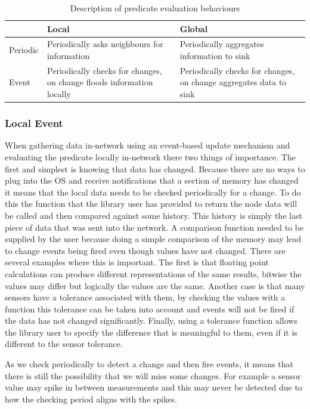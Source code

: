 \begin{table}[H]
\centering
\begin{tabular}{| l | m{5cm} | m{5cm} |}
\hline
~ & Local & Global \\
\hline
Periodic & Periodically asks neighbours for information & Periodically aggregates information to sink \\
\hline
Event & Periodically checks for changes, on change floods information locally &  Periodically checks for changes, on change aggregates data to sink \\
\hline
\end{tabular}
\caption{Description of predicate evaluation behaviours}
\end{table}


\subsubsection{Local Event}

When gathering data in-network using an event-based update mechanism and evaluating the predicate locally in-network there two things of importance. The first and simplest is knowing that data has changed. Because there are no ways to plug into the OS and receive notifications that a section of memory has changed it means that the local data needs to be checked periodically for a change. To do this the function that the library user has provided to return the node data will be called and then compared against some history. This history is simply the last piece of data that was sent into the network. A comparison function needed to be supplied by the user because doing a simple comparison of the memory may lead to change events being fired even though values have not changed. There are several examples where this is important. The first is that floating point calculations can produce different representations of the same results, bitwise the values may differ but logically the values are the same. Another case is that many sensors have a tolerance associated with them, by checking the values with a function this tolerance can be taken into account and events will not be fired if the data has not changed significantly. Finally, using a tolerance function allows the library user to specify the difference that is meaningful to them, even if it is different to the sensor tolerance.

As we check periodically to detect a change and then fire events, it means that there is still the possibility that we will miss some changes. For example a sensor value may spike in between measurements and this may never be detected due to how the checking period aligns with the spikes.


